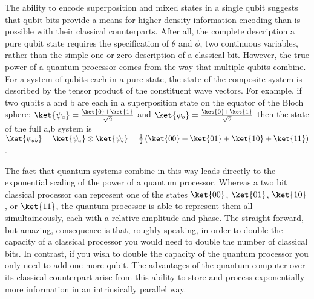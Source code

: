 {The ability to encode superposition and mixed states in a single qubit suggests that qubit bits provide a means for higher density information encoding than is possible with their classical counterparts.
After all, the complete description a pure qubit state requires the specification of $\theta$ and $\phi$, two continuous variables,
rather than the simple one or zero description of a classical bit.
However, the true power of a quantum processor comes from the way that multiple qubits combine.
For a system of qubits each in a pure state, the state of the composite system is described by the tensor product of the constituent wave vectors.
For example, if two qubits a and b are each in a superposition state on the equator of the Bloch sphere:
$\ket{\psi_a} = \frac{\ket{0}+\ket{1}}{\sqrt{2}}$ and $\ket{\psi_b} = \frac{\ket{0}+\ket{1}}{\sqrt{2}}$
then the state of the full a,b system is
$\ket{\psi_{ab}} = \ket{\psi_a} \otimes \ket{\psi_b} = \frac{1}{2} \left( \ket{00} + \ket{01} + \ket{10} + \ket{11} \right)$.

The fact that quantum systems combine in this way leads directly to the exponential scaling of the power of a quantum processor.
Whereas a two bit classical processor can represent one of the states $\ket{00}$, $\ket{01}$, $\ket{10}$, or $\ket{11}$,
the quantum processor is able to represent them all simultaineously, each with a relative amplitude and phase.
The straight-forward, but amazing, consequence is that, roughly speaking, in order to double the capacity of a classical processor you would need to double the number of classical bits.
In contrast, if you wish to double the capacity of the quantum processor you only need to add one more qubit.
The advantages of the quantum computer over its classical counterpart arise from this ability to store and process exponentially more information in an intrinsically parallel way.
}








